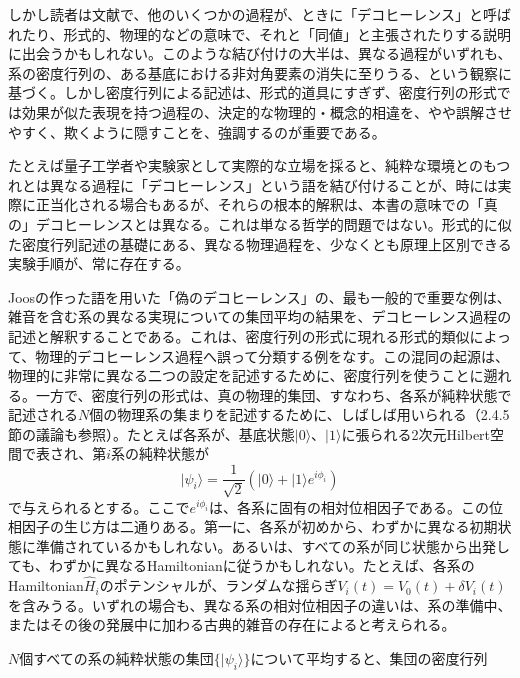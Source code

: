 しかし読者は文献で、他のいくつかの過程が、ときに「デコヒーレンス」と呼ばれたり、形式的、物理的などの意味で、それと「同値」と主張されたりする説明に出会うかもしれない。このような結び付けの大半は、異なる過程がいずれも、系の密度行列の、ある基底における非対角要素の消失に至りうる、という観察に基づく。しかし密度行列による記述は、形式的道具にすぎず、密度行列の形式では効果が似た表現を持つ過程の、決定的な物理的・概念的相違を、やや誤解させやすく、欺くように隠すことを、強調するのが重要である。

\hypertarget{srcpage:96}{}\label{srcpage:96}
たとえば量子工学者や実験家として実際的な立場を採ると、純粋な環境とのもつれとは異なる過程に「デコヒーレンス」という語を結び付けることが、時には実際に正当化される場合もあるが、それらの根本的解釈は、本書の意味での「真の」デコヒーレンスとは異なる。これは単なる哲学的問題ではない。形式的に似た密度行列記述の基礎にある、異なる物理過程を、少なくとも原理上区別できる実験手順が、常に存在する。

Joos\cite{ref017}の作った語を用いた「偽のデコヒーレンス」の、最も一般的で重要な例は、雑音を含む系の異なる実現についての集団平均の結果を、デコヒーレンス過程の記述と解釈することである。これは、密度行列の形式に現れる形式的類似によって、物理的デコヒーレンス過程へ誤って分類する例をなす。この混同の起源は、物理的に非常に異なる二つの設定を記述するために、密度行列を使うことに遡れる。一方で、密度行列の形式は、真の物理的集団、すなわち、各系が純粋状態で記述される$N$個の物理系の集まりを記述するために、しばしば用いられる（2.4.5節の議論も参照）。たとえば各系が、基底状態$\lvert0\rangle$、$\lvert1\rangle$に張られる2次元Hilbert空間で表され、第$i$系の純粋状態が
\begin{equation}\lvert\psi_i\rangle=\frac1{\sqrt2}(\lvert0\rangle+\lvert1\rangle e^{i\phi_i})\tag{2.118}\end{equation}
で与えられるとする。ここで$e^{i\phi_i}$は、各系に固有の相対位相因子である。この位相因子の生じ方は二通りある。第一に、各系が初めから、わずかに異なる初期状態に準備されているかもしれない。あるいは、すべての系が同じ状態から出発しても、わずかに異なるHamiltonianに従うかもしれない。たとえば、各系のHamiltonian$\hat H_i$のポテンシャルが、ランダムな揺らぎ$V_i(t)=V_0(t)+\delta V_i(t)$を含みうる\cite{ref121}。いずれの場合も、異なる系の相対位相因子の違いは、系の準備中、またはその後の発展中に加わる古典的雑音の存在によると考えられる。

$N$個すべての系の純粋状態の集団$\{\lvert\psi_i\rangle\}$について平均すると、集団の密度行列

